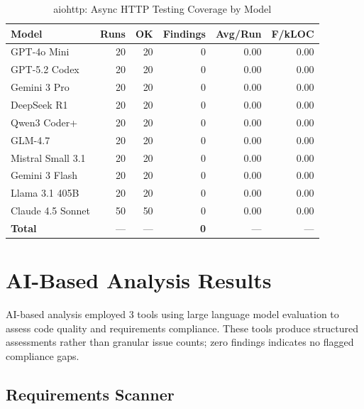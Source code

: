 \begin{table}[htbp]
    \centering
    \caption{aiohttp: Async HTTP Testing Coverage by Model}
    \label{tab:tool_aiohttp}
    \small
    \begin{tabular}{@{} l r r r r r @{}}
        \toprule
        \textbf{Model} & \textbf{Runs} & \textbf{OK} & \textbf{Findings} & \textbf{Avg/Run} & \textbf{F/kLOC} \\
        \midrule
        GPT-4o Mini & 20 & 20 & 0 & 0.00 & 0.00 \\
        GPT-5.2 Codex & 20 & 20 & 0 & 0.00 & 0.00 \\
        Gemini 3 Pro & 20 & 20 & 0 & 0.00 & 0.00 \\
        DeepSeek R1 & 20 & 20 & 0 & 0.00 & 0.00 \\
        Qwen3 Coder+ & 20 & 20 & 0 & 0.00 & 0.00 \\
        GLM-4.7 & 20 & 20 & 0 & 0.00 & 0.00 \\
        Mistral Small 3.1 & 20 & 20 & 0 & 0.00 & 0.00 \\
        Gemini 3 Flash & 20 & 20 & 0 & 0.00 & 0.00 \\
        Llama 3.1 405B & 20 & 20 & 0 & 0.00 & 0.00 \\
        Claude 4.5 Sonnet & 50 & 50 & 0 & 0.00 & 0.00 \\
        \midrule
        \textbf{Total} & --- & --- & \textbf{0} & --- & --- \\
        \bottomrule
    \end{tabular}
\end{table}

\section{AI-Based Analysis Results}
\label{sec:ai_results}

AI-based analysis employed 3 tools using large language model evaluation to assess code quality and requirements compliance. These tools produce structured assessments rather than granular issue counts; zero findings indicates no flagged compliance gaps.

\subsection{Requirements Scanner}

